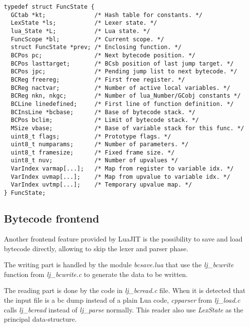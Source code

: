 \begin{lstlisting}[style=CStyle]
typedef struct FuncState {
  GCtab *kt;              /* Hash table for constants. */
  LexState *ls;           /* Lexer state. */
  lua_State *L;           /* Lua state. */
  FuncScope *bl;          /* Current scope. */
  struct FuncState *prev; /* Enclosing function. */
  BCPos pc;               /* Next bytecode position. */
  BCPos lasttarget;       /* BCsb position of last jump target. */
  BCPos jpc;              /* Pending jump list to next bytecode. */
  BCReg freereg;          /* First free register. */
  BCReg nactvar;          /* Number of active local variables. */
  BCReg nkn, nkgc;        /* Number of lua_Number/GCobj constants */
  BCLine linedefined;     /* First line of function definition. */
  BCInsLine *bcbase;      /* Base of bytecode stack. */
  BCPos bclim;            /* Limit of bytecode stack. */
  MSize vbase;            /* Base of variable stack for this func. */
  uint8_t flags;          /* Prototype flags. */
  uint8_t numparams;      /* Number of parameters. */
  uint8_t framesize;      /* Fixed frame size. */
  uint8_t nuv;            /* Number of upvalues */
  VarIndex varmap[...];   /* Map from register to variable idx. */
  VarIndex uvmap[...];    /* Map from upvalue to variable idx. */
  VarIndex uvtmp[...];    /* Temporary upvalue map. */
} FuncState;
\end{lstlisting}


\subsection{Bytecode frontend}
\label{Subsec:bc-frontend}

Another frontend feature provided by LuaJIT is the possibility to save and load
bytecode directly, allowing to skip the lexer and parser phase.

The writing part is handled by the module \emph{bcsave.lua} that use the
\emph{lj\_bcwrite} function from \emph{lj\_bcwrite.c} to generate the data to be written.

The reading part is done by the code in \emph{lj\_bcread.c} file. When it is
detected that the input file is a bc dump instead of a plain Lua code,
\emph{cpparser} from \emph{lj\_load.c} calls \emph{lj\_bcread} instead of
\emph{lj\_parse} normally. This reader also use \emph{LexState} as the principal
data-structure.


